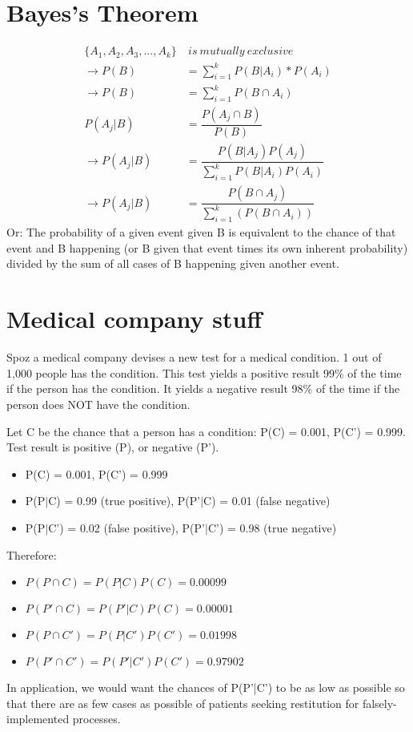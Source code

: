 \documentclass[]{article}
\begin{document}
	\section{Bayes's Theorem}
	\begin{align*}
	\{A_1, A_2, A_3,...,A_k\}&\ is\ mutually\ exclusive\\ 
	\rightarrow P(B) &= \sum_{i = 1}^{k}P(B|A_i)*P(A_i) \\
	\rightarrow P(B) &= \sum_{i = 1}^{k}P(B\cap A_i) \\
	P(A_j|B) &= \dfrac{P(A_j\cap B)}{P(B)} \\
	\rightarrow P(A_j|B) &= \dfrac{P(B|A_j)P(A_j)}{
		\sum_{i=1}^{k}P(B|A_i)P(A_i)
	}\\
	\rightarrow P(A_j|B) &= \dfrac{P(B\cap A_j)}{\sum_{i=1}^{k}(P(B\cap A_i))}
	\end{align*}
	Or: The probability of a given event given B is equivalent to the chance of that event and B happening (or B given that event times its own inherent probability) divided by the sum of all cases of B happening given another event.
	
	\section{Medical company stuff}
	Spoz a medical company devises a new test for a medical condition. 1 out of 1,000 people has the condition. This test yields a positive result 99\% of the time if the person has the condition. It yields a negative result 98\% of the time if the person does NOT have the condition.
	
	Let C be the chance that a person has a condition: P(C) = 0.001, P(C') = 0.999. Test result is positive (P), or negative (P').
	
	\begin{itemize}
		\item P(C) = 0.001, P(C') = 0.999
		\item P(P$|$C) = 0.99 (true positive), P(P'$|$C) = 0.01 (false negative)
		\item P(P$|$C') = 0.02 (false positive), P(P'$|$C') = 0.98 (true negative)
	\end{itemize}
	Therefore:
	\begin{itemize}
		\item $P(P\cap C) = P(P|C)P(C) = 0.00099$
		\item $P(P'\cap C) = P(P'|C)P(C) = 0.00001$
		\item $P(P\cap C') = P(P|C')P(C') = 0.01998$
		\item $P(P'\cap C') = P(P'|C')P(C') = 0.97902$
	\end{itemize}

	In application, we would want the chances of P(P'|C') to be as low as possible so that there are as few cases as possible of patients seeking restitution for falsely-implemented processes.
	
\end{document}
